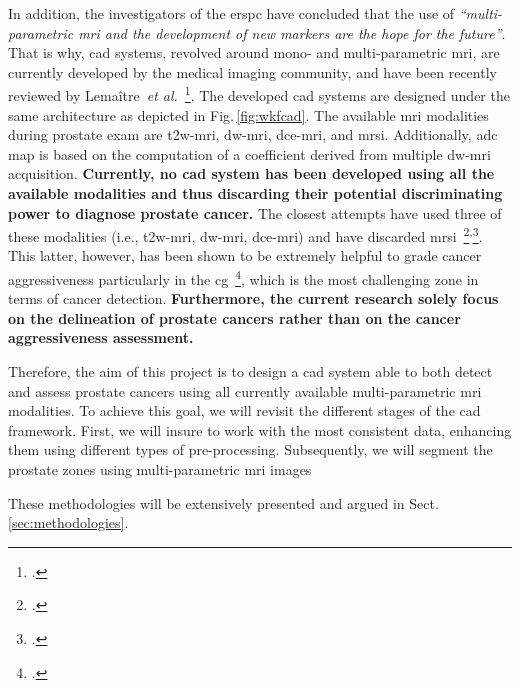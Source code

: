 In addition, the investigators of the \ac{erspc} have concluded that the use of \emph{``multi-parametric \ac{mri} and the development of new markers are the hope for the future''}.
That is why, \ac{cad} systems, revolved around mono- and multi-parametric \ac{mri}, are currently developed by the medical imaging community, and have been recently reviewed by Lema\^itre~\emph{et al.}~\footcite{Lemaitre2015}.
The developed \ac{cad} systems are designed under the same architecture as depicted in Fig.\,\ref{fig:wkfcad}. 
The available \ac{mri} modalities during prostate exam are \ac{t2w}-\ac{mri}, \ac{dw}-\ac{mri}, \ac{dce}-\ac{mri}, and \ac{mrsi}. 
Additionally, \ac{adc} map is based on the computation of a coefficient derived from multiple \ac{dw}-\ac{mri} acquisition.
\textbf{Currently, no \ac{cad} system has been developed using all the available modalities and thus discarding their potential discriminating power to diagnose prostate cancer.}
The closest attempts have used three of these modalities (i.e., \ac{t2w}-\ac{mri}, \ac{dw}-\ac{mri}, \ac{dce}-\ac{mri}) and have discarded \ac{mrsi}~\footcite{Litjens2014}\textsuperscript{,}\footcite{Viswanath2011}.
This latter, however, has been shown to be extremely helpful to grade cancer aggressiveness particularly in the \ac{cg}~\footcite{Vos2015}, which is the most challenging zone in terms of cancer detection.
\textbf{Furthermore, the current research solely focus on the delineation of prostate cancers rather than on the cancer aggressiveness assessment.}



Therefore, the aim of this project is to design a \ac{cad} system able to both detect and assess prostate cancers using all currently available multi-parametric \ac{mri} modalities.
To achieve this goal, we will revisit the different stages of the \ac{cad} framework.
First, we will insure to work with the most consistent data, enhancing them using different types of pre-processing.
Subsequently, we will segment the prostate zones using multi-parametric \ac{mri} images 

These methodologies will be extensively presented and argued in Sect.\,\ref{sec:methodologies}.

